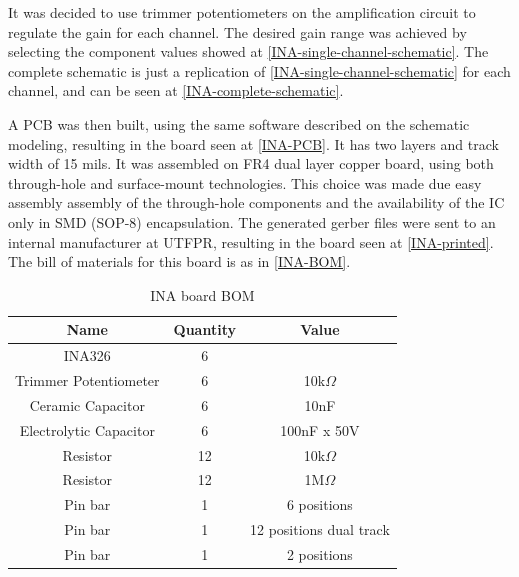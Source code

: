 It was decided to use trimmer potentiometers on the amplification circuit to
regulate the gain for each channel. The desired gain range was achieved by selecting
the component values showed at \autoref{INA-single-channel-schematic}. The complete
schematic is just a replication of \autoref{INA-single-channel-schematic}
for each channel, and can be seen at \autoref{INA-complete-schematic}.

A PCB was then built, using the same software described on the schematic modeling, resulting
in the board seen at \autoref{INA-PCB}. It has two layers and track width of 15 mils.
It was assembled on FR4 dual layer copper board, using both through-hole and
surface-mount technologies. This choice was made due easy assembly assembly
of the through-hole components and the availability of the IC only in SMD (SOP-8)
encapsulation. The generated gerber files were sent to an internal manufacturer
at UTFPR, resulting in the board seen at \autoref{INA-printed}.
The bill of materials for this board is as in \autoref{INA-BOM}.

\begin{table}[htb]
  \begin{center}
    \ABNTEXreducedfont
    \caption[INA Board BOM]{INA board BOM}
    \label{INA-BOM}
    \begin{tabular}{c|c|c}
      \hline
      Name & Quantity & Value\\
      \hline \hline
      INA326 & 6 & \\
      Trimmer Potentiometer & 6 & 10k$\Omega$ \\
      Ceramic Capacitor & 6 & 10nF \\
      Electrolytic Capacitor & 6 & 100nF x 50V \\
      Resistor & 12 & 10k$\Omega$ \\
      Resistor & 12 & 1M$\Omega$ \\
      Pin bar & 1 & 6 positions  \\
      Pin bar & 1 & 12 positions dual track \\
      Pin bar & 1 & 2 positions \\
      \hline
    \end{tabular}
  \end{center}
\end{table}

